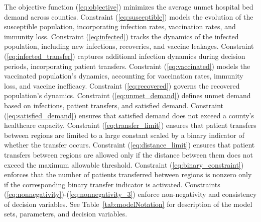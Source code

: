 \documentclass{article}
\begin{document}
The objective function (\ref{eq:objective}) minimizes the average unmet hospital bed demand across counties. Constraint (\ref{eq:susceptible}) models the evolution of the susceptible population, incorporating infection rates, vaccination rates, and immunity loss. Constraint (\ref{eq:infected}) tracks the dynamics of the infected population, including new infections, recoveries, and vaccine leakages. Constraint (\ref{eq:infected_transfer}) captures additional infection dynamics during decision periods, incorporating patient transfers. Constraint (\ref{eq:vaccinated}) models the vaccinated population's dynamics, accounting for vaccination rates, immunity loss, and vaccine inefficacy. Constraint (\ref{eq:recovered}) governs the recovered population's dynamics. Constraint (\ref{eq:unmet_demand}) defines unmet demand based on infections, patient transfers, and satisfied demand. Constraint (\ref{eq:satisfied_demand}) ensures that satisfied demand does not exceed a county's healthcare capacity. Constraint (\ref{eq:transfer_limit}) ensures that patient transfers between regions are limited to a large constant scaled by a binary indicator of whether the transfer occurs. Constraint (\ref{eq:distance_limit}) ensures that patient transfers between regions are allowed only if the distance between them does not exceed the maximum allowable threshold. Constraint (\ref{eq:binary_constraint}) enforces that the number of patients transferred between regions is nonzero only if the corresponding binary transfer indicator is activated. Constraints (\ref{eq:nonnegativity})-(\ref{eq:nonnegativity_3}) enforce non-negativity and consistency of decision variables. See Table~\ref{tab:modelNotation} for description of the model sets, parameters, and decision variables. 
\end{document}
